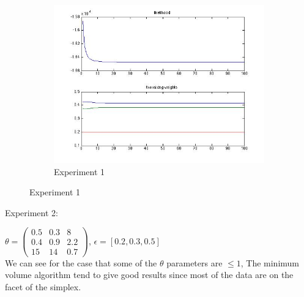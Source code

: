 \documentclass[14pt]{book}
\begin{document}
  \begin{figure}
        \centering
        \begin{subfigure}[b]{1\textwidth}
                \centering
                \includegraphics[width=\textwidth]{r12.jpg}
                \caption{Experiment 1 }
                \label{fig:psi}
        \end{subfigure}%

        \caption{Experiment 1 }\label{fig:animals}
\end{figure}
Experiment 2: \\
\par $\theta =\begin{pmatrix} 
0.5 & 0.3 & 8\\ 
 0.4& 0.9 & 2.2 \\ 
 15 & 14 & 0.7 
\end{pmatrix}$, $\epsilon = [0.2,0.3,0.5]$ \\
We can see for the case that some of the $\theta$ parameters are $\le 1$, The minimum volume algorithm tend to give good results since most of the data are on the facet of the simplex. 
\end{document}
